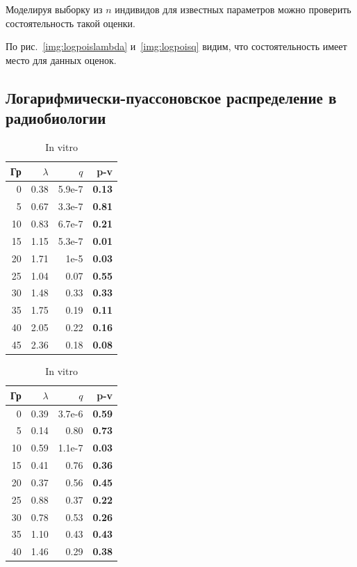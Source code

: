 \documentclass[12pt, specialist, subf, substylefile = spbu.rtx]{disser}
\begin{document}
	Моделируя выборку из $n$ индивидов для известных параметров можно проверить состоятельность такой оценки.

	По рис.~\ref{img:logpoislambda} и~\ref{img:logpoisq} видим, что состоятельность имеет место для данных оценок.
	
	\subsection{Логарифмически-пуассоновское распределение в радиобиологии}
	
	\begin{table}[ht]
		\centering
		\caption*{Оценки параметров и значимости критерия хи-квадрат по данным in vivo и in vitro для логарифмически-пуассоновского распределения.}
		\begin{minipage}{0.4\textwidth}
			\centering
			\caption{In vivo}
			
			\begin{tabular}{rrrr}
				\hline
				Гр & $\lambda$ & $q$ & \textbf{p-v} \\ 
				\hline
				0 & 0.38 & 5.9e-7 & \textbf{0.13} \\ 
				5 & 0.67 & 3.3e-7 & \textbf{0.81} \\ 
				10 & 0.83 & 6.7e-7 & \textbf{0.21} \\ 
				15 & 1.15 & 5.3e-7 & \textbf{0.01} \\ 
				20 & 1.71 & 1e-5 & \textbf{0.03} \\ 
				25 & 1.04 & 0.07 & \textbf{0.55} \\ 
				30 & 1.48 & 0.33 & \textbf{0.33} \\ 
				35 & 1.75 & 0.19 & \textbf{0.11} \\ 
				40 & 2.05 & 0.22 & \textbf{0.16} \\
				45 & 2.36 & 0.18 & \textbf{0.08} \\ 
				\hline
			\end{tabular}
			\label{tab:logpoisvivo}
		\end{minipage}
		\begin{minipage}{0.4\textwidth}
			\centering
			\caption{In vitro}
			
			\begin{tabular}{rrrr}
				\hline
				Гр & $\lambda$ & $q$ & \textbf{p-v} \\ 
				\hline
				0 & 0.39 & 3.7e-6 & \textbf{0.59} \\ 
				5 & 0.14 & 0.80 & \textbf{0.73} \\ 
				10 & 0.59 & 1.1e-7 & \textbf{0.03} \\ 
				15 & 0.41 & 0.76 & \textbf{0.36} \\ 
				20 & 0.37 & 0.56 & \textbf{0.45} \\ 
				25 & 0.88 & 0.37 & \textbf{0.22} \\ 
				30 & 0.78 & 0.53 & \textbf{0.26} \\ 
				35 & 1.10 & 0.43 & \textbf{0.43} \\ 
				40 & 1.46 & 0.29 & \textbf{0.38} \\ 
				\hline
			\end{tabular}
			\label{tab:logpoisvitro}
		\end{minipage}
	\end{table}
	
\end{document}
